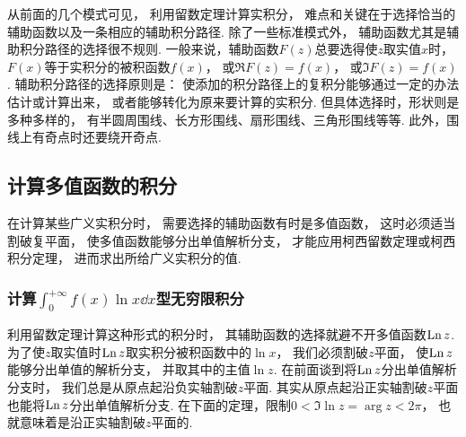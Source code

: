 从前面的几个模式可见，
利用留数定理计算实积分，
难点和关键在于选择恰当的辅助函数以及一条相应的辅助积分路径.
除了一些标准模式外，
辅助函数尤其是辅助积分路径的选择很不规则.
一般来说，辅助函数\(F(z)\)总要选得使\(z\)取实值\(x\)时，
\(F(x)\)等于实积分的被积函数\(f(x)\)，
或\(\Re{F(z)} = f(x)\)，
或\(\Im{F(z)} = f(x)\).
辅助积分路径的选择原则是：
使添加的积分路径上的复积分能够通过一定的办法估计或计算出来，
或者能够转化为原来要计算的实积分.
但具体选择时，形状则是多种多样的，
有半圆周围线、长方形围线、扇形围线、三角形围线等等.
此外，围线上有奇点时还要绕开奇点.

\subsection{计算多值函数的积分}
在计算某些广义实积分时，
需要选择的辅助函数有时是多值函数，
这时必须适当割破复平面，
使多值函数能够分出单值解析分支，
才能应用柯西留数定理或柯西积分定理，
进而求出所给广义实积分的值.

\subsubsection{计算\texorpdfstring{\(\int_0^{+\infty} f(x) \ln x \dd{x}\)型}{含有对数函数的}无穷限积分}
利用留数定理计算这种形式的积分时，
其辅助函数的选择就避不开多值函数\(\operatorname{Ln} z\).
为了使\(z\)取实值时\(\operatorname{Ln} z\)取实积分被积函数中的\(\ln x\)，
我们必须割破\(z\)平面，
使\(\operatorname{Ln} z\)能够分出单值的解析分支，
并取其中的主值\(\ln z\).
在前面谈到将\(\operatorname{Ln} z\)分出单值解析分支时，
我们总是从原点起沿负实轴割破\(z\)平面.
其实从原点起沿正实轴割破\(z\)平面也能将\(\operatorname{Ln} z\)分出单值解析分支.
在下面的定理，限制\(0 < \Im \ln z = \arg z < 2\pi\)，
也就意味着是沿正实轴割破\(z\)平面的.

